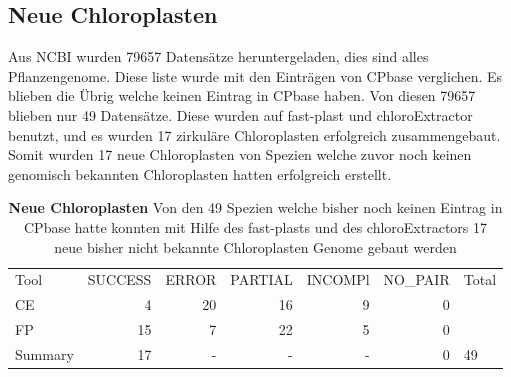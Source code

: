 \documentclass{scrartcl}
\begin{document}
\subsection{Neue Chloroplasten}
\label{sec-4-10}
Aus NCBI wurden 79657 Datensätze heruntergeladen, dies sind alles Pflanzengenome. Diese liste wurde mit den Einträgen von CPbase verglichen. Es blieben die Übrig welche keinen Eintrag in CPbase haben. 
Von diesen 79657 blieben nur 49 Datensätze. Diese wurden auf fast-plast und chloroExtractor benutzt, und es wurden 17 zirkuläre Chloroplasten erfolgreich zusammengebaut. Somit wurden 17 neue Chloroplasten von Spezien
welche zuvor noch keinen genomisch bekannten Chloroplasten hatten erfolgreich erstellt.
\begin{table}[!h]
\caption[Neue Chloroplasten]{\textbf{Neue Chloroplasten} Von den 49 Spezien welche bisher noch keinen Eintrag in CPbase hatte konnten mit Hilfe des fast-plasts und des chloroExtractors 17 neue bisher nicht bekannte Chloroplasten Genome gebaut werden}
\begin{center}
\begin{tabular}{lrrrrrl}
Tool & SUCCESS & ERROR & PARTIAL & INCOMPl & NO\_PAIR & Total\\
CE & 4 & 20 & 16 & 9 & 0 & \\
FP & 15 & 7 & 22 & 5 & 0 & \\
Summary & 17 & - & - & - & 0 & 49\\
\end{tabular}
\end{center}
\end{table}
\end{document}
